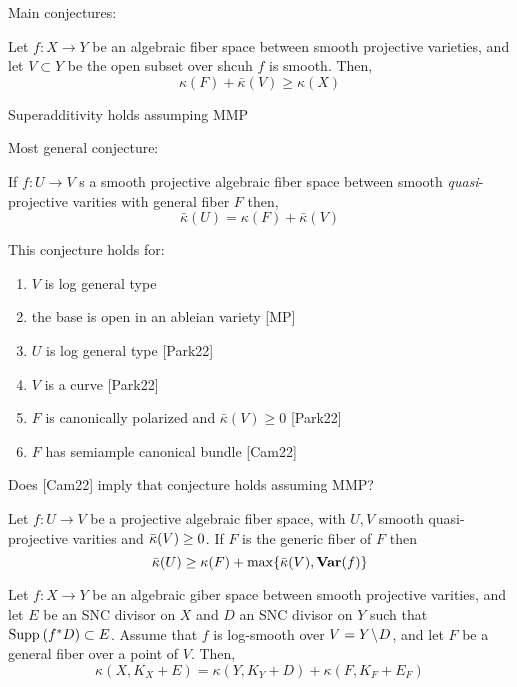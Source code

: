 \documentclass[12pt]{article}
\begin{document}
Main conjectures:

\begin{conj}[Superadditivity]
Let $f : X \to Y$ be an algebraic fiber space between smooth projective varieties, and let $V \subset Y$ be the open subset over shcuh $f$ is smooth. Then,
\[ \kappa(F) + \bar{\kappa}(V) \ge \kappa(X) \]
\end{conj}

\begin{theorem}[PS22]
Superadditivity holds assumping MMP
\end{theorem}


Most general conjecture:

\begin{conj}
If $f : U \to V$ s a smooth projective algebraic fiber space between smooth \textit{quasi}-projective varities with general fiber $F$ then,
\[ \bar{\kappa}(U) = \kappa(F) + \bar{\kappa}(V) \]
\end{conj}

\begin{theorem}
This conjecture holds for:
\begin{enumerate}
\item $V$ is log general type 
\item the base is open in an ableian variety [MP]
\item $U$ is log general type [Park22]
\item $V$ is a curve [Park22]
\item $F$ is canonically polarized and $\bar{\kappa}(V) \ge 0$ [Park22]
\item $F$ has semiample canonical bundle [Cam22]
\end{enumerate}
\end{theorem}

\begin{rmk}
Does [Cam22] imply that conjecture holds assuming MMP? 
\end{rmk}

\begin{conj}[open $C^+_{n,m}$]
Let $f : U \to V$ be a projective algebraic fiber space, with $U, V$ smooth quasi-projective varities and $\bar{\kappa}(V) \ge 0$. If $F$ is the generic fiber of $F$ then
\[ \bar{\kappa}(U) \ge \kappa(F) + \max \{ \bar{\kappa}(V), \mathbf{Var}(f) \} \]
\end{conj}

\begin{conj}
Let $f : X \to Y$ be an algebraic giber space between smooth projective varities, and let $E$ be an SNC divisor on $X$ and $D$ an SNC divisor on $Y$ such that $\mathrm{Supp}_{}\left(f^* D \right) \subset E$. Assume that $f$ is log-smooth over $V = Y\! \setminus \! D$, and let $F$ be a general fiber over a point of $V$. Then,
\[ \kappa(X, K_X + E) = \kappa(Y, K_Y + D) + \kappa(F, K_F + E_F) \]
\end{conj}
\end{document}
